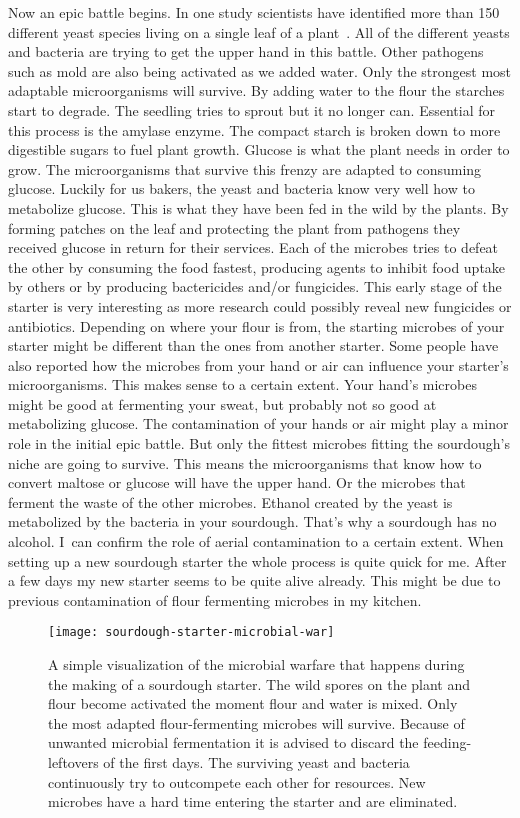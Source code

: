 Now an epic battle begins. In one study scientists
have identified more than 150 different yeast species living
on a single leaf of a plant~\cite{yeasts+biocontrol+agent}.
All of the different yeasts and bacteria are trying to get
the upper hand in this battle. Other pathogens such as mold
are also being activated as we added water. Only the strongest
most adaptable microorganisms will survive. By adding water to the
flour the starches start to degrade. The seedling tries to
sprout but it no longer can. Essential for this process is the
amylase enzyme. The compact starch is broken down to more
digestible sugars to fuel plant growth. Glucose is what the
plant needs in order to grow. The microorganisms that survive
this frenzy are adapted to consuming glucose. Luckily for us
bakers, the yeast and bacteria know very well how to metabolize
glucose. This is what they have been fed in the wild by the plants.
By forming patches on the leaf and protecting the plant from
pathogens they received glucose in return for their services.
Each of the microbes tries to defeat the other by consuming the
food fastest, producing agents to inhibit food uptake by others or by producing
bactericides and/or fungicides. This early stage of the starter
is very interesting as more research could possibly reveal
new fungicides or antibiotics. Depending on where your flour
is from, the starting microbes of your starter might be different
than the ones from another starter. Some people have also reported
how the microbes from your hand or air can influence your starter's
microorganisms. This makes sense to a certain extent. Your
hand's microbes might be good at fermenting your sweat, but
probably not so good at metabolizing glucose. The contamination
of your hands or air might play a minor role in the initial epic
battle. But only the fittest microbes fitting the sourdough's
niche are going to survive. This means the microorganisms that know
how to convert maltose or glucose will have the upper hand. Or the
microbes that ferment the waste of the other microbes. Ethanol created
by the yeast is metabolized by the bacteria in your sourdough. That's
why a sourdough has no alcohol. I~can confirm the role of aerial
contamination to a certain extent. When setting up a new sourdough
starter the whole process is quite quick for me. After a few
days my new starter seems to be quite alive already. This might
be due to previous contamination of flour fermenting microbes in
my kitchen.

\begin{figure}[!htb]
  \texttt{[image: sourdough-starter-microbial-war]}
  \caption{A simple visualization of the microbial warfare that happens during
      the making of a sourdough starter. The wild spores on the plant and
      flour become activated the moment flour and water is mixed.  Only the
      most adapted flour-fermenting microbes will survive. Because of unwanted
      microbial fermentation it is advised to discard the feeding-leftovers of
      the first days. The surviving yeast and bacteria continuously try to
      outcompete each other for resources. New microbes have a hard time
      entering the starter and are eliminated.}%
  \label{fig:sourdough-starter-microbial-war}
\end{figure}



